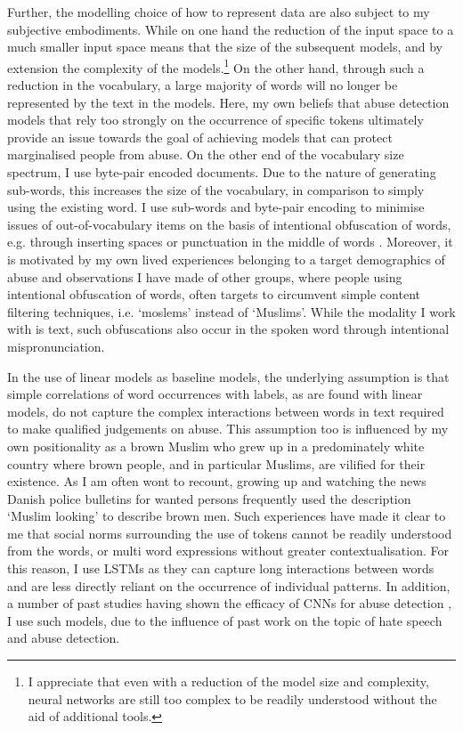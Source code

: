 Further, the modelling choice of how to represent data are also subject to my subjective embodiments. While on one hand the reduction of the input space to a much smaller input space means that the size of the subsequent models, and by extension the complexity of the models.\footnote{I appreciate that even with a reduction of the model size and complexity, neural networks are still too complex to be readily understood without the aid of additional tools.} On the other hand, through such a reduction in the vocabulary, a large majority of words will no longer be represented by the text in the models. Here, my own beliefs that abuse detection models that rely too strongly on the occurrence of specific tokens ultimately provide an issue towards the goal of achieving models that can protect marginalised people from abuse. On the other end of the vocabulary size spectrum, I use byte-pair encoded documents. Due to the nature of generating sub-words, this increases the size of the vocabulary, in comparison to simply using the existing word. I use sub-words and byte-pair encoding to minimise issues of out-of-vocabulary items on the basis of intentional obfuscation of words, e.g. through inserting spaces or punctuation in the middle of words \citep{Rottger:2021}. Moreover, it is motivated by my own lived experiences belonging to a target demographics of abuse and observations I have made of other groups, where people using intentional obfuscation of words, often targets to circumvent simple content filtering techniques, i.e. `moslems' instead of `Muslims'. While the modality I work with is text, such obfuscations also occur in the spoken word through intentional mispronunciation.

In the use of linear models as baseline models, the underlying assumption is that simple correlations of word occurrences with labels, as are found with linear models, do not capture the complex interactions between words in text required to make qualified judgements on abuse. This assumption too is influenced by my own positionality as a brown Muslim who grew up in a predominately white country where brown people, and in particular Muslims, are vilified for their existence. As I am often wont to recount, growing up and watching the news Danish police bulletins for wanted persons frequently used the description `Muslim looking' to describe brown men. Such experiences have made it clear to me that social norms surrounding the use of tokens cannot be readily understood from the words, or multi word expressions without greater contextualisation. For this reason, I use LSTMs as they can capture long interactions between words and are less directly reliant on the occurrence of individual patterns. In addition, a number of past studies having shown the efficacy of CNNs for abuse detection \citep{Park:2017, Mitchell:2019,Kolhatkar:2020,Rizwan:2020,Safaya:2020,Gamback:2017}, I use such models, due to the influence of past work on the topic of hate speech and abuse detection.

